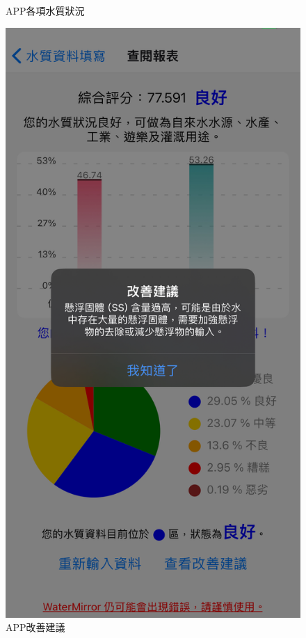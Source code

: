 \documentclass[12pt,a4paper]{article}
\begin{document}
\begin{enumerate}
\begin{enumerate}[label=\arabic*.]
\begin{enumerate}[label=3-2-\arabic*.]
\begin{figure}[H]
\begin{minipage}{0.3\textwidth}
                    \caption{APP各項水質狀況}
                \end{minipage}%
                \hfill
                \begin{minipage}{0.3\textwidth}
                    \centering
                    \includegraphics[width=\textwidth]{resources/image/front-end/APP改善說明.png}
                    \caption{APP改善建議}
                \end{minipage}
            \end{figure}
    \end{enumerate}


\end{enumerate}
\end{enumerate}
\end{document}
